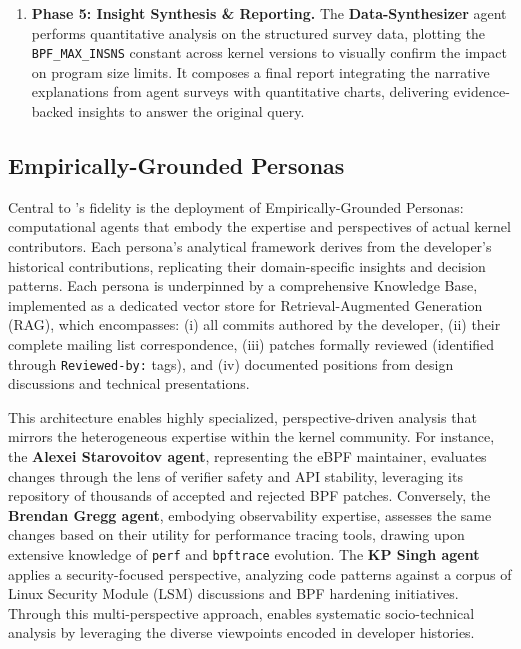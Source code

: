 \begin{enumerate}
\item \textbf{Phase 5: Insight Synthesis \& Reporting.} The \textbf{Data-Synthesizer} agent performs quantitative analysis on the structured survey data, plotting the \texttt{BPF\_MAX\_INSNS} constant across kernel versions to visually confirm the impact on program size limits. It composes a final report integrating the narrative explanations from agent surveys with quantitative charts, delivering evidence-backed insights to answer the original query.
\end{enumerate}


\subsection{Empirically-Grounded Personas}

Central to \sys's fidelity is the deployment of Empirically-Grounded Personas: computational agents that embody the expertise and perspectives of actual kernel contributors. Each persona's analytical framework derives from the developer's historical contributions, replicating their domain-specific insights and decision patterns. Each persona is underpinned by a comprehensive Knowledge Base, implemented as a dedicated vector store for Retrieval-Augmented Generation (RAG), which encompasses: (i) all commits authored by the developer, (ii) their complete mailing list correspondence, (iii) patches formally reviewed (identified through \texttt{Reviewed-by:} tags), and (iv) documented positions from design discussions and technical presentations.

This architecture enables highly specialized, perspective-driven analysis that mirrors the heterogeneous expertise within the kernel community. For instance, the \textbf{Alexei Starovoitov agent}, representing the eBPF maintainer, evaluates changes through the lens of verifier safety and API stability, leveraging its repository of thousands of accepted and rejected BPF patches. Conversely, the \textbf{Brendan Gregg agent}, embodying observability expertise, assesses the same changes based on their utility for performance tracing tools, drawing upon extensive knowledge of \texttt{perf} and \texttt{bpftrace} evolution. The \textbf{KP Singh agent} applies a security-focused perspective, analyzing code patterns against a corpus of Linux Security Module (LSM) discussions and BPF hardening initiatives. Through this multi-perspective approach, \sys enables systematic socio-technical analysis by leveraging the diverse viewpoints encoded in developer histories.

